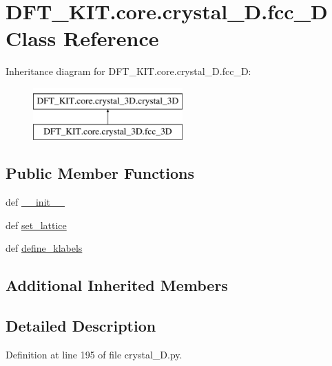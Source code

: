 \hypertarget{class_d_f_t___k_i_t_1_1core_1_1crystal__3_d_1_1fcc__3_d}{\section{D\+F\+T\+\_\+\+K\+I\+T.\+core.\+crystal\+\_\+D.\+fcc\+\_\+D Class Reference}
\label{class_d_f_t___k_i_t_1_1core_1_1crystal__3_d_1_1fcc__3_d}
}
Inheritance diagram for D\+F\+T\+\_\+\+K\+I\+T.\+core.\+crystal\+\_\+D.\+fcc\+\_\+D\+:\begin{figure}[H]
\begin{center}
\leavevmode
\includegraphics[height=2.000000cm]{class_d_f_t___k_i_t_1_1core_1_1crystal__3_d_1_1fcc__3_d}
\end{center}
\end{figure}
\subsection*{Public Member Functions}
\begin{DoxyCompactItemize}
\item 
def \hyperlink{class_d_f_t___k_i_t_1_1core_1_1crystal__3_d_1_1fcc__3_d_abdd976094ae54ffb6cf6302a2fe0928a}{\+\_\+\+\_\+init\+\_\+\+\_\+}
\item 
def \hyperlink{class_d_f_t___k_i_t_1_1core_1_1crystal__3_d_1_1fcc__3_d_ab33239aebb5e2714120fbb3691e1a200}{set\+\_\+lattice}
\item 
def \hyperlink{class_d_f_t___k_i_t_1_1core_1_1crystal__3_d_1_1fcc__3_d_a50cd517a076d6d633c81841aa53b9595}{define\+\_\+klabels}
\end{DoxyCompactItemize}
\subsection*{Additional Inherited Members}


\subsection{Detailed Description}


Definition at line 195 of file crystal\+\_\+D.\+py.



